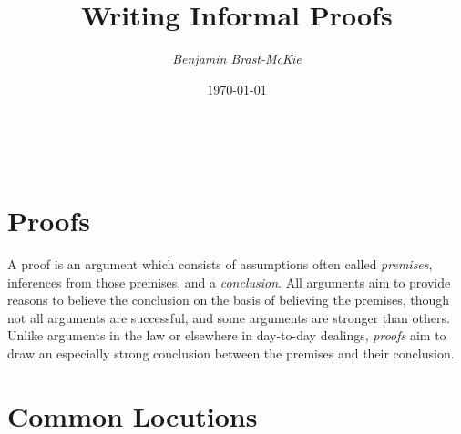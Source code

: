 \documentclass[a4paper, 11pt]{article} %
\title{\textbf{Writing Informal Proofs}} %
\author{\em Benjamin Brast-McKie} %
\date{\today\vspace{-0pt}} %
\makeatletter
\renewcommand{\maketitle}{ %
\begin{flushright} %
{\LARGE\@title} %

\vspace{10pt} %

{\@author} %
\\\@date %

\vspace{30pt} %
\end{flushright}
}
\makeatother
\begin{document}
\maketitle %

\thispagestyle{empty}


\section*{Proofs}

A proof is an argument which consists of assumptions often called \textit{premises}, inferences from those premises, and a \textit{conclusion}.
All arguments aim to provide reasons to believe the conclusion on the basis of believing the premises, though not all arguments are successful, and some arguments are stronger than others.
Unlike arguments in the law or elsewhere in day-to-day dealings, \textit{proofs} aim to draw an especially strong conclusion between the premises and their conclusion.

\section*{Common Locutions}
\end{document}
